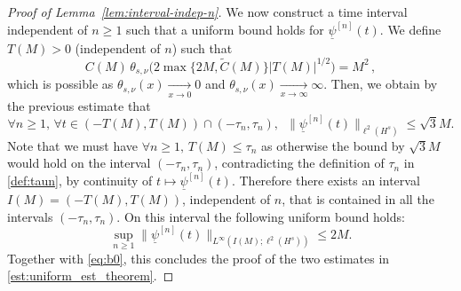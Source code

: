 \documentclass[10pt,a4paper]{amsart}
\newcommand{\thetasnu}{\theta_{s,\nu}}
\newcommand{\ulpsi}{\underline{\psi}}
\begin{document}
\begin{proof}[Proof of Lemma~\ref{lem:interval-indep-n}]
		We now construct a time interval independent of $n \geq 1$ such that a uniform bound holds for $\ulpsi^{[n]}(t)$. We define $ T(M) > 0 $ (independent of $n$) such that
		\begin{equation}
			C(M) \,\thetasnu \big( 2 \max\{2M,\tilde{C}(M)\}  |T(M)|^{1/2}\big) = M^2 \,,
		\end{equation}
		which is possible as $\thetasnu (x)\xrightarrow[x\to0]{}0$ and $\thetasnu (x)\xrightarrow[x\to\infty]{}\infty$. 
		Then, we obtain by the previous estimate that
		\begin{equation}
			\forall n \geq 1, \, \forall t \in \left( -T(M), T(M) \right) \cap (-\tau_n, \tau_n), \;\ \| \ulpsi^{[n]}(t) \|_{\ell^2(H^{s})} \leq \sqrt{3}M .
		\end{equation} 
		Note that we must have $ \forall n \geq 1, \, T(M) \leq \tau_n $ as otherwise the bound by $\sqrt{3}M$ would hold on the interval $ (-\tau_n,\tau_n) $, contradicting the definition of $\tau_n$ in \eqref{def:taun}, by continuity of $t\mapsto \ulpsi^{[n]}(t)$. Therefore there exists an interval $ I(M) = \left( -T(M),T(M) \right) $, independent of $n$, that is contained in all the intervals $(-\tau_n,\tau_n)$. On this interval the following uniform bound holds:
		\begin{equation}
			\sup_{n \geq 1} \| \ulpsi^{[n]}(t) \|_{L^{\infty}(I(M);\ell^2(H^{s}))} \leq 2M .
		\end{equation}
		Together with \eqref{eq:b0}, this concludes the proof of the two  estimates in \eqref{est:uniform_est_theorem}.
	\end{proof}
\end{document}
